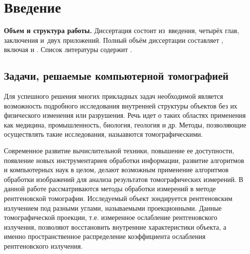 \chapter*{Введение}							%

\newcommand{\actuality}{}
\newcommand{\progress}{}
\newcommand{\aim}{{\textbf\aimTXT}}
\newcommand{\tasks}{\textbf{\tasksTXT}}
\newcommand{\novelty}{\textbf{\noveltyTXT}}
\newcommand{\influence}{\textbf{\influenceTXT}}
\newcommand{\methods}{\textbf{\methodsTXT}}
\newcommand{\defpositions}{\textbf{\defpositionsTXT}}
\newcommand{\reliability}{\textbf{\reliabilityTXT}}
\newcommand{\probation}{\textbf{\probationTXT}}
\newcommand{\contribution}{\textbf{\contributionTXT}}
\newcommand{\publications}{\textbf{\publicationsTXT}}


\textbf{Объем и структура работы.} Диссертация состоит из~введения, четырёх глав, заключения и~двух приложений.
%
Полный объём диссертации составляет
, включая
 и
.   Список литературы содержит  
.

\actuality

\section{Задачи, решаемые компьютерной томографией}

Для успешного решения многих прикладных задач необходимой является возможность подробного исследования внутренней структуры объектов без их физического изменения или разрушения.
Речь идет о таких областях применения как медицина, промышленность, биология, геология и др. 
Методы, позволяющие осуществлять такие исследования, назыавются томографическими.

Современное развитие вычислительной техники, повышение ее доступности, появление новых инструментариев обработки информации, развитие алгоритмов и компьютерных наук в целом, делают возможным применение алгоритмов обработки изображений для анализа результатов томографических измерений.
В данной работе рассматриваются методы обработки измерений в методе рентгеновской томографии.
Исследуемый объект зондируется рентгеновским излучением под разными углами, называемыми проекционными.
Данные томографической проекции, т.е. измеренное ослабление рентгеновского излучения, позволяют восстановить внутренние характеристики объекта, а именно пространственное распределение коэффициента ослабления рентгеновского излучения.

